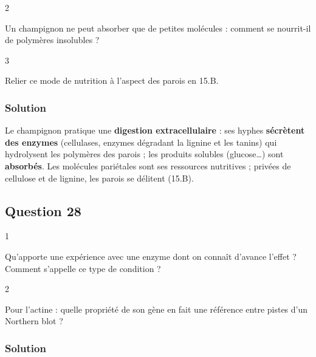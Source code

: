 \documentclass[11pt,a4paper]{article}
\begin{document}
\begin{indication}{2}

Un champignon ne peut absorber que de petites molécules : comment se nourrit-il de polymères insolubles ?

\end{indication}

\begin{indication}{3}

Relier ce mode de nutrition à l'aspect des parois en 15.B.

\end{indication}

\hypertarget{solution-27}{%
\subsubsection{Solution}\label{solution-27}}

Le champignon pratique une \textbf{digestion extracellulaire} : ses hyphes \textbf{sécrètent des enzymes} (cellulases, enzymes dégradant la lignine et les tanins) qui hydrolysent les polymères des parois ; les produits solubles (glucose\ldots) sont \textbf{absorbés}. Les molécules pariétales sont ses ressources nutritives ; privées de cellulose et de lignine, les parois se délitent (15.B).

\hypertarget{question-28}{%
\subsection{Question 28}\label{question-28}}

\begin{indication}{1}

Qu'apporte une expérience avec une enzyme dont on connaît d'avance l'effet ? Comment s'appelle ce type de condition ?

\end{indication}

\begin{indication}{2}

Pour l'actine : quelle propriété de son gène en fait une référence entre pistes d'un Northern blot ?

\end{indication}

\hypertarget{solution-28}{%
\subsubsection{Solution}\label{solution-28}}
\end{document}
